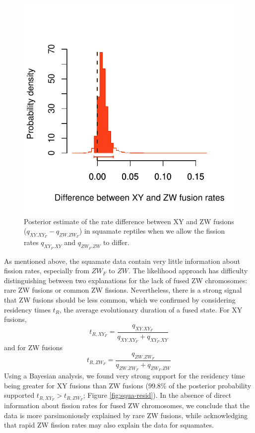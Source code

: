\documentclass[12pt,twoside]{article}
\begin{document}
\begin{figure}[p]
\centering
\includegraphics[scale=1.25]{figs/karyotype-fusion-squa-6par}
\caption{Posterior estimate of the rate difference between XY and ZW fusions ($q_{XY.XY_F} - q_{ZW.ZW_F}$) in squamate reptiles when we allow the fission rates $q_{XY_F.XY}$ and $q_{ZW_F.ZW}$ to differ.}
\label{fig:squa-dif}
\end{figure}

As mentioned above, the squamate data contain very little information about fission rates, especially from $ZW_F$ to $ZW$. The likelihood approach has difficulty distinguishing between two explanations for the lack of fused ZW chromosomes: rare ZW fusions or common ZW fissions. Nevertheless, there is a strong signal that ZW fusions should be less common, which we confirmed by considering residency times $t_R$, the average evolutionary duration of a fused state. For XY fusions,
\begin{equation}
t_{R,XY_F} = \frac{q_{XY.XY_F}}{q_{XY.XY_F} + q_{XY_F.XY}}
\end{equation}
and for ZW fusions
\begin{equation}
t_{R,ZW_F} = \frac{q_{ZW.ZW_F}}{q_{ZW.ZW_F} + q_{ZW_F.ZW}}
\end{equation}
Using a Bayesian analysis, we found very strong support for the residency time being greater for XY fusions than ZW fusions (99.8\% of the posterior probability supported $t_{R,XY_F} > t_{R,ZW_F}$; Figure \ref{fig:squa-resid}). In the absence of direct information about fission rates for fused ZW chromosomes, we conclude that the data is more parsimoniously explained by rare ZW fusions, while acknowledging that rapid ZW fission rates may also explain the data for squamates.
\end{document}
